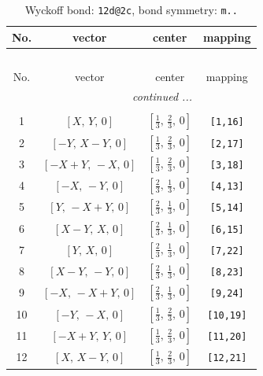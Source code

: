 \documentclass[fleqn,8pt]{jsarticle}
\begin{document}
\begin{longtable}{cccc}
\caption{Wyckoff bond: {\tt 12d@2c}, bond symmetry: {\tt m..}}
 \\
 \hline \hline
No. & vector & center & mapping \\ \hline \endfirsthead

\multicolumn{3}{l}{\tablename\ \thetable{}} \\
 \hline \hline
No. & vector & center & mapping \\ \hline \endhead

 \hline \hline
\multicolumn{3}{r}{\footnotesize\it continued ...} \\ \endfoot

 \hline \hline
\multicolumn{3}{r}{} \\ \endlastfoot

1 & $\left[ X,\, Y,\, 0 \right]$ & $\left[ \frac{1}{3},\, \frac{2}{3},\, 0 \right]$ & {\tt [1,16]} \\ \hline
2 & $\left[ - Y,\, X - Y,\, 0 \right]$ & $\left[ \frac{1}{3},\, \frac{2}{3},\, 0 \right]$ & {\tt [2,17]} \\ \hline
3 & $\left[ - X + Y,\, - X,\, 0 \right]$ & $\left[ \frac{1}{3},\, \frac{2}{3},\, 0 \right]$ & {\tt [3,18]} \\ \hline
4 & $\left[ - X,\, - Y,\, 0 \right]$ & $\left[ \frac{2}{3},\, \frac{1}{3},\, 0 \right]$ & {\tt [4,13]} \\ \hline
5 & $\left[ Y,\, - X + Y,\, 0 \right]$ & $\left[ \frac{2}{3},\, \frac{1}{3},\, 0 \right]$ & {\tt [5,14]} \\ \hline
6 & $\left[ X - Y,\, X,\, 0 \right]$ & $\left[ \frac{2}{3},\, \frac{1}{3},\, 0 \right]$ & {\tt [6,15]} \\ \hline
7 & $\left[ Y,\, X,\, 0 \right]$ & $\left[ \frac{2}{3},\, \frac{1}{3},\, 0 \right]$ & {\tt [7,22]} \\ \hline
8 & $\left[ X - Y,\, - Y,\, 0 \right]$ & $\left[ \frac{2}{3},\, \frac{1}{3},\, 0 \right]$ & {\tt [8,23]} \\ \hline
9 & $\left[ - X,\, - X + Y,\, 0 \right]$ & $\left[ \frac{2}{3},\, \frac{1}{3},\, 0 \right]$ & {\tt [9,24]} \\ \hline
10 & $\left[ - Y,\, - X,\, 0 \right]$ & $\left[ \frac{1}{3},\, \frac{2}{3},\, 0 \right]$ & {\tt [10,19]} \\ \hline
11 & $\left[ - X + Y,\, Y,\, 0 \right]$ & $\left[ \frac{1}{3},\, \frac{2}{3},\, 0 \right]$ & {\tt [11,20]} \\ \hline
12 & $\left[ X,\, X - Y,\, 0 \right]$ & $\left[ \frac{1}{3},\, \frac{2}{3},\, 0 \right]$ & {\tt [12,21]} \\
\end{longtable}
\end{document}
